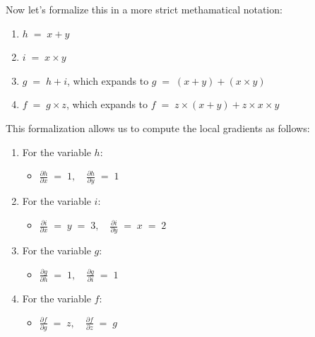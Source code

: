 \documentclass[12pt]{report}
\begin{document}
\noindent Now let's formalize this in a more strict methamatical notation:
\begin{enumerate}
    \item $h \;=\; x + y$
    \item $i \;=\; x \times y$
    \item $g \;=\; h + i$, which expands to $g \;=\; (x + y) + (x \times y)$
    \item $f \;=\; g \times z$, which expands to $f \;=\; z \times (x + y) + z \times x \times y$
\end{enumerate}

\noindent This formalization allows us to compute the local gradients as follows:
\begin{enumerate}
    \item For the variable $h$:
        \begin{itemize}
            \item $\frac{\partial h}{\partial x} \;=\; 1,\quad \frac{\partial h}{\partial y} \;=\; 1$
        \end{itemize}

    \item For the variable $i$:
        \begin{itemize}
            \item $\frac{\partial i}{\partial x} \;=\; y \;=\; 3,\quad
                   \frac{\partial i}{\partial y} \;=\; x \;=\; 2$
        \end{itemize}

    \item For the variable $g$:
        \begin{itemize}
            \item $\frac{\partial g}{\partial h} \;=\; 1,\quad \frac{\partial g}{\partial i} \;=\; 1$
        \end{itemize}
    
        \item For the variable $f$:
        \begin{itemize}
            \item $\frac{\partial f}{\partial g} \;=\; z,\quad \frac{\partial f}{\partial z} \;=\; g$
        \end{itemize}
\end{enumerate} \clearpage
\end{document}
